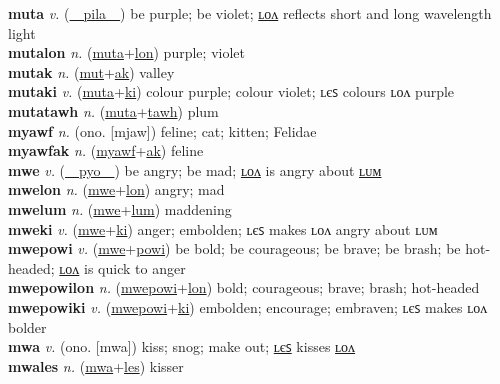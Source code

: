 \textbf{muta} \textit{v.} (\hyperref[pila]{~~pila~~})
be purple; be violet; \hyperref[mutalon]{ʟᴏᴧ} reflects short and long wavelength light \label{muta} \\
\textbf{mutalon} \textit{n.} (\hyperref[muta]{muta}+\hyperref[lon]{lon})
purple; violet \label{mutalon} \\
\textbf{mutak} \textit{n.} (\hyperref[mut]{mut}+\hyperref[ak]{ak})
valley \label{mutak} \\
\textbf{mutaki} \textit{v.} (\hyperref[muta]{muta}+\hyperref[ki]{ki})
colour purple; colour violet; ʟєꜱ colours ʟᴏᴧ purple \label{mutaki} \\
\textbf{mutatawh} \textit{n.} (\hyperref[muta]{muta}+\hyperref[tawh]{tawh})
plum \label{mutatawh} \\
\textbf{myawf} \textit{n.} (ono. [mjaw])
feline; cat; kitten; Felidae \label{myawf} \\
\textbf{myawfak} \textit{n.} (\hyperref[myawf]{myawf}+\hyperref[ak]{ak})
feline \label{myawfak} \\
\textbf{mwe} \textit{v.} (\hyperref[pyo]{~~pyo~~})
be angry; be mad; \hyperref[mwelon]{ʟᴏᴧ} is angry about \hyperref[mwelum]{ʟᴜᴍ} \label{mwe} \\
\textbf{mwelon} \textit{n.} (\hyperref[mwe]{mwe}+\hyperref[lon]{lon})
angry; mad \label{mwelon} \\
\textbf{mwelum} \textit{n.} (\hyperref[mwe]{mwe}+\hyperref[lum]{lum})
maddening \label{mwelum} \\
\textbf{mweki} \textit{v.} (\hyperref[mwe]{mwe}+\hyperref[ki]{ki})
anger; embolden; ʟєꜱ makes ʟᴏᴧ angry about ʟᴜᴍ \label{mweki} \\
\textbf{mwepowi} \textit{v.} (\hyperref[mwe]{mwe}+\hyperref[powi]{powi})
be bold; be courageous; be brave; be brash; be hot-headed; \hyperref[mwepowilon]{ʟᴏᴧ} is quick to anger \label{mwepowi} \\
\textbf{mwepowilon} \textit{n.} (\hyperref[mwepowi]{mwepowi}+\hyperref[lon]{lon})
bold; courageous; brave; brash; hot-headed \label{mwepowilon} \\
\textbf{mwepowiki} \textit{v.} (\hyperref[mwepowi]{mwepowi}+\hyperref[ki]{ki})
embolden; encourage; embraven; ʟєꜱ makes ʟᴏᴧ bolder \label{mwepowiki} \\
\textbf{mwa} \textit{v.} (ono. [mwa])
kiss; snog; make out; \hyperref[mwales]{ʟєꜱ} kisses \hyperref[mwalon]{ʟᴏᴧ} \label{mwa} \\
\textbf{mwales} \textit{n.} (\hyperref[mwa]{mwa}+\hyperref[les]{les})
kisser \label{mwales} \\
